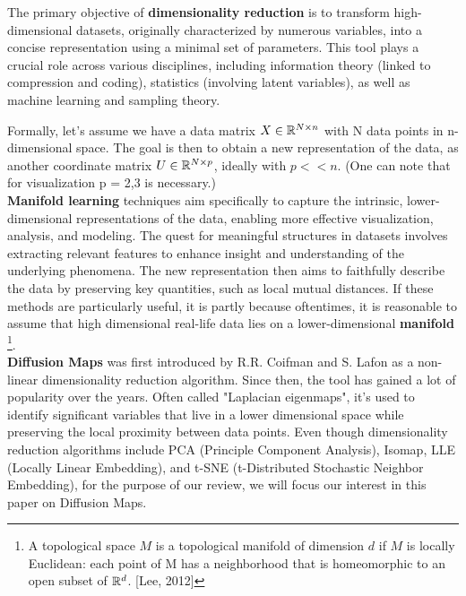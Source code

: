
The primary objective of \textbf{dimensionality reduction} is to transform high-dimensional datasets, originally characterized by numerous variables, into a concise representation using a minimal set of parameters. This tool plays a crucial role across various disciplines, including information theory (linked to compression and coding), statistics (involving latent variables), as well as machine learning and sampling theory. 

Formally, let's assume we have a data matrix $X \in{\mathbb{R}^{N \times n}}$ with N data points in n-dimensional space.
The goal is then to obtain a new representation of the data, as another coordinate matrix $U \in \mathbb{R}^{N \times p}$, ideally with $p<<n$.
(One can note that for visualization p = 2,3 is necessary.) \\

\textbf{Manifold learning} techniques aim specifically to capture the intrinsic, lower-dimensional representations of the data, enabling more effective visualization, analysis, and modeling. The quest for meaningful structures in datasets involves extracting relevant features to enhance insight and understanding of the underlying phenomena. The new representation then aims to faithfully describe the data by preserving key quantities, such as local mutual distances. 
If these methods are particularly useful, it is partly because oftentimes, it is reasonable to assume that high dimensional real-life data lies on a lower-dimensional \textbf{manifold} \footnote{A topological space $M$ is a topological manifold of dimension $d$ if $M$ is locally Euclidean: each point of M has a neighborhood that is homeomorphic to an open subset of $\mathbb{R}^d$. [Lee, 2012]}. \\

\textbf{Diffusion Maps} was first introduced by R.R. Coifman and S. Lafon \cite{COIFMAN20065} as a non-linear dimensionality reduction algorithm. Since then, the tool has gained a lot of popularity over the years. Often called "Laplacian eigenmaps", it's used to identify significant variables that live in a lower dimensional space while preserving the local proximity between data points. 
Even though dimensionality reduction algorithms include PCA (Principle Component Analysis), Isomap, LLE (Locally Linear Embedding), and t-SNE (t-Distributed Stochastic Neighbor Embedding), for the purpose of our review, we will focus our interest in this paper on Diffusion Maps. \\
 
